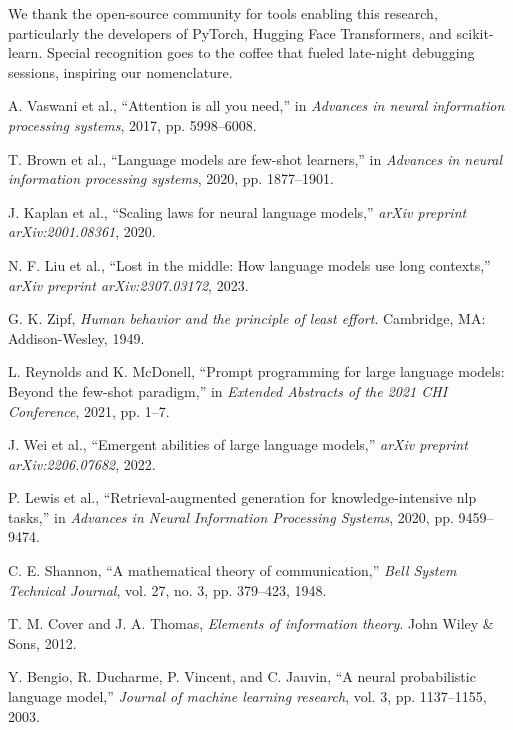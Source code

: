 \documentclass[conference]{IEEEtran}
\begin{document}
We thank the open-source community for tools enabling this research, particularly the developers of PyTorch, Hugging Face Transformers, and scikit-learn. Special recognition goes to the coffee that fueled late-night debugging sessions, inspiring our nomenclature.

\begin{thebibliography}{99}

A. Vaswani et al., ``Attention is all you need,'' in \textit{Advances in neural information processing systems}, 2017, pp. 5998–6008.

T. Brown et al., ``Language models are few-shot learners,'' in \textit{Advances in neural information processing systems}, 2020, pp. 1877–1901.

J. Kaplan et al., ``Scaling laws for neural language models,'' \textit{arXiv preprint arXiv:2001.08361}, 2020.

N. F. Liu et al., ``Lost in the middle: How language models use long contexts,'' \textit{arXiv preprint arXiv:2307.03172}, 2023.

G. K. Zipf, \textit{Human behavior and the principle of least effort}. Cambridge, MA: Addison-Wesley, 1949.

L. Reynolds and K. McDonell, ``Prompt programming for large language models: Beyond the few-shot paradigm,'' in \textit{Extended Abstracts of the 2021 CHI Conference}, 2021, pp. 1–7.

J. Wei et al., ``Emergent abilities of large language models,'' \textit{arXiv preprint arXiv:2206.07682}, 2022.

P. Lewis et al., ``Retrieval-augmented generation for knowledge-intensive nlp tasks,'' in \textit{Advances in Neural Information Processing Systems}, 2020, pp. 9459–9474.

C. E. Shannon, ``A mathematical theory of communication,'' \textit{Bell System Technical Journal}, vol. 27, no. 3, pp. 379–423, 1948.

T. M. Cover and J. A. Thomas, \textit{Elements of information theory}. John Wiley \& Sons, 2012.

Y. Bengio, R. Ducharme, P. Vincent, and C. Jauvin, ``A neural probabilistic language model,'' \textit{Journal of machine learning research}, vol. 3, pp. 1137–1155, 2003.


\end{thebibliography}
\end{document}
